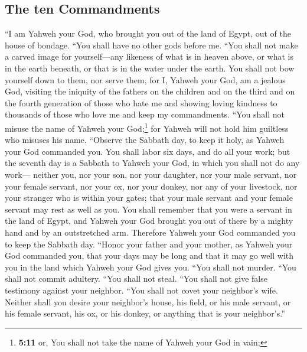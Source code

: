 \hypertarget{the-ten-commandments}{%
\subsection{The ten Commandments}\label{the-ten-commandments}}

 ``I am Yahweh your God, who brought you out of the land
of Egypt, out of the house of bondage.  ``You shall have
no other gods before me.  ``You shall not make a carved
image for yourself---any likeness of what is in heaven above, or what is
in the earth beneath, or that is in the water under the earth.
 You shall not bow yourself down to them, nor serve them,
for I, Yahweh your God, am a jealous God, visiting the iniquity of the
fathers on the children and on the third and on the fourth generation of
those who hate me  and showing loving kindness to
thousands of those who love me and keep my commandments. 
``You shall not misuse the name of Yahweh your God;\footnote{\textbf{5:11}
  or, You shall not take the name of Yahweh your God in vain;} for
Yahweh will not hold him guiltless who misuses his name. 
``Observe the Sabbath day, to keep it holy, as Yahweh your God commanded
you.  You shall labor six days, and do all your work;
 but the seventh day is a Sabbath to Yahweh your God, in
which you shall not do any work--- neither you, nor your son, nor your
daughter, nor your male servant, nor your female servant, nor your ox,
nor your donkey, nor any of your livestock, nor your stranger who is
within your gates; that your male servant and your female servant may
rest as well as you.  You shall remember that you were a
servant in the land of Egypt, and Yahweh your God brought you out of
there by a mighty hand and by an outstretched arm. Therefore Yahweh your
God commanded you to keep the Sabbath day.  ``Honor your
father and your mother, as Yahweh your God commanded you, that your days
may be long and that it may go well with you in the land which Yahweh
your God gives you.  ``You shall not murder.
 ``You shall not commit adultery.  ``You
shall not steal.  ``You shall not give false testimony
against your neighbor.  ``You shall not covet your
neighbor's wife. Neither shall you desire your neighbor's house, his
field, or his male servant, or his female servant, his ox, or his
donkey, or anything that is your neighbor's.''

